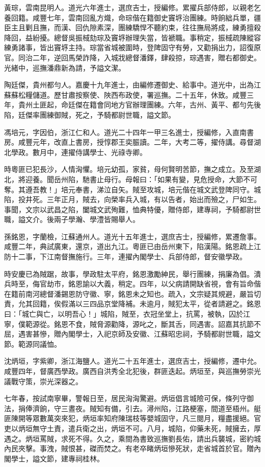 \begin{pinyinscope}
黃琮，雲南昆明人。道光六年進士，選庶吉士，授編修。累擢兵部侍郎，以親老乞養回籍。咸豐七年，雲南回亂方熾，命琮偕在籍御史竇垿治團練。時餉絀兵單，疆臣主且剿且撫，而漢、回仇隙素深，團練驕悍不聽約束，往往撫局將成，練勇擅殺降回，益紛擾。總督吳振棫劾琮及竇垿辦理失當，皆褫職。事稍定，振棫疏陳縱容練勇諸事，皆出竇垿主持。琮當省城被圍時，登陴固守有勞，又勸捐出力，詔復原官。同治二年，逆回馬榮詐降，入城戕總督潘鐸，肆殺掠，琮遇害，贈右都御史。光緒中，巡撫潘鼎新為請，予謚文潔。

陶廷傑，貴州都勻人。嘉慶十九年進士，由編修遷御史、給事中。道光中，出為江蘇蘇松糧儲道。歷甘肅按察使、陜西布政使，署巡撫。二十五年，休致。咸豐三年，貴州土匪起，命廷傑在籍會同地方官辦理團練。六年，古州、黃平、都勻先後陷，廷傑率團練御賊，死之，予騎都尉世職，謚文節。

馮培元，字因伯，浙江仁和人。道光二十四年一甲三名進士，授編修，入直南書房。咸豐元年，改直上書房，授惇郡王奕脤讀。二年，大考二等，擢侍講。尋督湖北學政。數月中，連擢侍講學士、光祿寺卿。

時粵匪已犯長沙，人情洶懼。培元幼孤，家貧，母何賢明苦節，撫之成立。及至湖北，將迎養。聞岳州陷，馳書止母行。母報曰：「如果有變，見危授命，大節不可奪。其遵吾教！」培元奉書，涕泣自矢。賊至攻城，培元偕在城文武登陴同守。城陷，投井死。三年正月，賊去，向榮率兵入城，有以告者，始出而殮之，尸如生。事聞，文宗以武昌之陷，闔城文武殉難，恤典特優，贈侍郎，建專祠，予騎都尉世職，謚文介。後兩子學瀚、學澧皆賜舉人。

孫銘恩，字蘭檢，江蘇通州人。道光十五年進士，選庶吉士，授編修，累遷詹事。咸豐二年，典試廣東，還京，道出九江。粵匪已由岳州東下，陷漢陽。銘恩疏上江防十二事，下江南督撫施行。三年，連擢內閣學士、兵部侍郎，督安徽學政。

時安慶已為賊踞，故事，學政駐太平府，銘恩激勵紳民，舉行團練，捐廉為倡。潰兵時至，侮官劫市，銘恩諭以大義，稍定。四年，以父病請開缺省視，會有旨命偕在籍前南河總督潘錫恩防守徽、寧，銘恩未之知也。疏入，文宗疑其規避，嚴旨切責，允其回籍，俟假滿以三四品京堂降補。未逾月，賊犯太平，從者請避之。銘恩曰：「城亡與亡，以明吾心！」城陷，賊至，衣冠坐堂上，抗罵，被執，囚於江寧，僕範源從。銘恩不食，賊脅源勸降，源叱之，斷其舌，同遇害。詔嘉其抗節不屈，遇害甚慘，贈內閣學士，入祀京師及安徽、江蘇昭忠祠，予騎都尉世職，謚文節。範源同議恤。

沈炳垣，字紫卿，浙江海鹽人。道光二十五年進士，選庶吉士，授編修，遷中允。咸豐四年，督廣西學政。廣西自洪秀全北犯後，群匪迭起。炳垣至，與巡撫勞崇光議戰守策，崇光深器之。

七年春，按試南寧畢，警報日至，居民洶洶驚避。炳垣倡言城險可保，條列守御法，捐俸濟餉，守三晝夜。賊知有備，引去。潯州陷，江路梗塞，間道至梧州。艇匪陳開等眾數萬突來犯，炳垣率知府陳瑞枝等嬰城固守，凡三閱月，糧盡援絕。官吏以炳垣無守土責，遣兵衛之出，炳垣不可。八月，城陷，仰藥未死，賊擁去，厚遇之。炳垣罵賊，求死不得。久之，乘間為書致巡撫劉長佑，請出兵襲城，密約城內民夾擊。事洩，賊恨甚，磔而焚之。有老卒睹炳垣慘死狀，走省城首於官。贈內閣學士，謚文節，建專祠桂林。


\end{pinyinscope}
